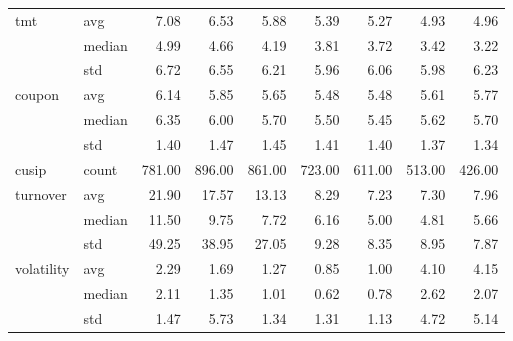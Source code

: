 \begin{tabular}{llrrrrrrr}
\cline{1-9}
\multirow[t]{3}{*}{tmt} & avg & 7.08 & 6.53 & 5.88 & 5.39 & 5.27 & 4.93 & 4.96 \\
 & median & 4.99 & 4.66 & 4.19 & 3.81 & 3.72 & 3.42 & 3.22 \\
 & std & 6.72 & 6.55 & 6.21 & 5.96 & 6.06 & 5.98 & 6.23 \\
\cline{1-9}
\multirow[t]{3}{*}{coupon} & avg & 6.14 & 5.85 & 5.65 & 5.48 & 5.48 & 5.61 & 5.77 \\
 & median & 6.35 & 6.00 & 5.70 & 5.50 & 5.45 & 5.62 & 5.70 \\
 & std & 1.40 & 1.47 & 1.45 & 1.41 & 1.40 & 1.37 & 1.34 \\
\cline{1-9}
cusip & count & 781.00 & 896.00 & 861.00 & 723.00 & 611.00 & 513.00 & 426.00 \\
\cline{1-9}
\multirow[t]{3}{*}{turnover} & avg & 21.90 & 17.57 & 13.13 & 8.29 & 7.23 & 7.30 & 7.96 \\
 & median & 11.50 & 9.75 & 7.72 & 6.16 & 5.00 & 4.81 & 5.66 \\
 & std & 49.25 & 38.95 & 27.05 & 9.28 & 8.35 & 8.95 & 7.87 \\
\cline{1-9}
\multirow[t]{3}{*}{volatility} & avg & 2.29 & 1.69 & 1.27 & 0.85 & 1.00 & 4.10 & 4.15 \\
 & median & 2.11 & 1.35 & 1.01 & 0.62 & 0.78 & 2.62 & 2.07 \\
 & std & 1.47 & 5.73 & 1.34 & 1.31 & 1.13 & 4.72 & 5.14 \\
\cline{1-9}
\bottomrule
\end{tabular}
